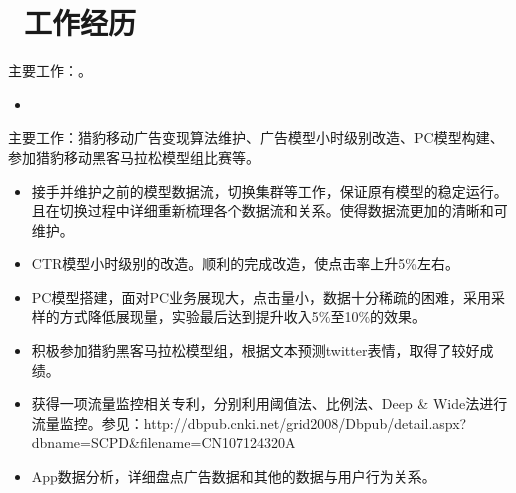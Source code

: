 \documentclass{resume}
\begin{document}



\section{\faUsers\ 工作经历}
\role{CTR、CVR预估}{广告算法}
\begin{onehalfspacing}
主要工作：。
\begin{itemize}
  \item 
  \end{itemize}
\end{onehalfspacing}

\begin{onehalfspacing}
主要工作：猎豹移动广告变现算法维护、广告模型小时级别改造、PC模型构建、参加猎豹移动黑客马拉松模型组比赛等。
\begin{itemize}
  \item 接手并维护之前的模型数据流，切换集群等工作，保证原有模型的稳定运行。且在切换过程中详细重新梳理各个数据流和关系。使得数据流更加的清晰和可维护。 
  \item CTR模型小时级别的改造。顺利的完成改造，使点击率上升5\%左右。
  \item PC模型搭建，面对PC业务展现大，点击量小，数据十分稀疏的困难，采用采样的方式降低展现量，实验最后达到提升收入5\%至10\%的效果。
  \item 积极参加猎豹黑客马拉松模型组，根据文本预测twitter表情，取得了较好成绩。
  \item 获得一项流量监控相关专利，分别利用阈值法、比例法、Deep \& Wide法进行流量监控。参见：http://dbpub.cnki.net/grid2008/Dbpub/detail.aspx?dbname=SCPD\&filename=CN107124320A
  \item App数据分析，详细盘点广告数据和其他的数据与用户行为关系。
\end{itemize}
\end{onehalfspacing}
\end{document}
